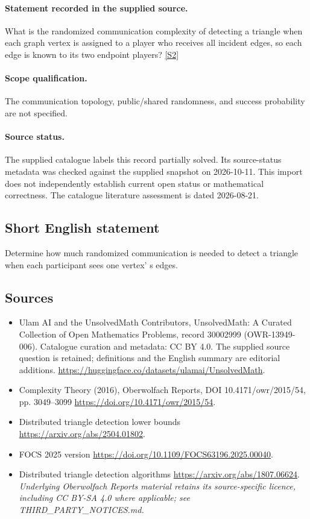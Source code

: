 \documentclass[11pt]{article}
\begin{document}
\paragraph{Statement recorded in the supplied source.}
What is the randomized communication complexity of detecting a triangle when each graph vertex is assigned to a player who receives all incident edges, so each edge is known to its two endpoint players? \href{https://doi.org/10.4171/owr/2015/54}{[S2]}
\paragraph{Scope qualification.}
The communication topology, public/shared randomness, and success probability are not specified.
\paragraph{Source status.}
The supplied catalogue labels this record partially solved. Its source-status metadata was checked against the supplied snapshot on 2026-10-11. This import does not independently establish current open status or mathematical correctness. The catalogue literature assessment is dated 2026-08-21.
\subsection{Short English statement}
Determine how much randomized communication is needed to detect a triangle when each participant sees one vertex' s edges.
\subsection{Sources}
\begin{itemize}
\item[S1] Ulam AI and the UnsolvedMath Contributors, UnsolvedMath: A Curated Collection of Open Mathematics Problems, record 30002999 (OWR-13949-006). Catalogue curation and metadata: CC BY 4.0. The supplied source question is retained; definitions and the English summary are editorial additions.
\url{https://huggingface.co/datasets/ulamai/UnsolvedMath}.
\item[S2] Complexity Theory (2016), Oberwolfach Reports, DOI 10.4171/owr/2015/54, pp. 3049--3099
\url{https://doi.org/10.4171/owr/2015/54}.
\item[S3] Distributed triangle detection lower bounds
\url{https://arxiv.org/abs/2504.01802}.
\item[S4] FOCS 2025 version
\url{https://doi.org/10.1109/FOCS63196.2025.00040}.
\item[S5] Distributed triangle detection algorithms
\url{https://arxiv.org/abs/1807.06624}.
\textit{Underlying Oberwolfach Reports material retains its source-specific licence, including CC BY-SA 4.0 where applicable; see THIRD\_PARTY\_NOTICES.md.}
\end{itemize}
\end{document}
